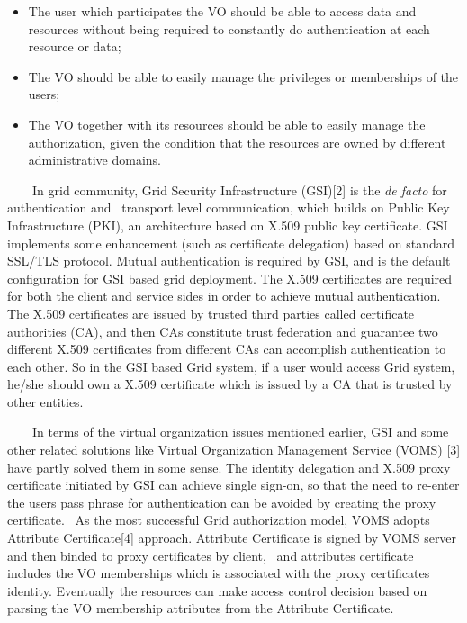 \documentclass{article}
\newcommand\liststyleLii{%
\renewcommand\labelitemi{${\bullet}$}
\renewcommand\labelitemii{${\circ}$}
\renewcommand\labelitemiii{${\blacksquare}$}
\renewcommand\labelitemiv{${\bullet}$}
}
\begin{document}
\liststyleLii
\begin{itemize}
\item The user which participates the VO should be able to access data
and resources without being required to constantly do authentication at
each resource or data; 
\item The VO should be able to easily manage the privileges or
memberships of the users; 
\item The VO together with its resources should be able to easily manage
the authorization, given the condition that the resources are owned by
different administrative domains.
\end{itemize}
\ \ \ \ In grid community, Grid Security Infrastructure (GSI)[2] is the
\textit{de facto} for authentication and \ transport level
communication, which builds on Public Key Infrastructure (PKI), an
architecture based on X.509 public key certificate. GSI implements some
enhancement (such as certificate delegation) based on standard SSL/TLS
protocol. Mutual authentication is required by GSI, and is the default
configuration for GSI based grid deployment. The X.509 certificates are
required for both the client and service sides in order to achieve
mutual authentication. The X.509 certificates are issued by trusted
third parties called certificate authorities (CA), and then CAs
constitute trust federation and guarantee two different X.509
certificates from different CAs can accomplish authentication to each
other. So in the GSI based Grid system, if a user would access Grid
system, he/she should own a X.509 certificate which is issued by a CA
that is trusted by other entities.

\ \ \ \ In terms of the virtual organization issues mentioned earlier,
GSI and some other related solutions like Virtual Organization
Management Service (VOMS) [3] have partly solved them in some sense.
The identity delegation and X.509 proxy certificate initiated by GSI
can achieve single sign-on, so that the need to re-enter the
user{\textquotesingle}s pass phrase for authentication can be avoided
by creating the proxy certificate. \ As the most successful Grid
authorization model, VOMS adopts Attribute Certificate[4] approach.
Attribute Certificate is signed by VOMS server and then binded to proxy
certificates by client, \ and attributes certificate includes the VO
memberships which is associated with the proxy
certificate{\textquotesingle}s identity. Eventually the resources can
make access control decision based on parsing the VO membership
attributes from the Attribute Certificate.
\end{document}
